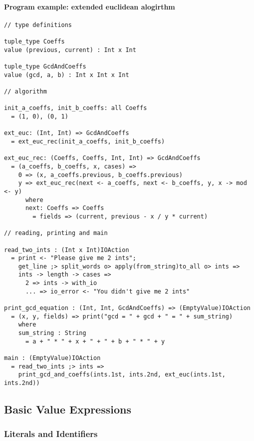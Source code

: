 \documentclass{article}
\begin{document}
\paragraph{Program example: extended euclidean alogirthm}
\begin{verbatim}
// type definitions

tuple_type Coeffs
value (previous, current) : Int x Int

tuple_type GcdAndCoeffs
value (gcd, a, b) : Int x Int x Int

// algorithm

init_a_coeffs, init_b_coeffs: all Coeffs
  = (1, 0), (0, 1)

ext_euc: (Int, Int) => GcdAndCoeffs
  = ext_euc_rec(init_a_coeffs, init_b_coeffs)

ext_euc_rec: (Coeffs, Coeffs, Int, Int) => GcdAndCoeffs
  = (a_coeffs, b_coeffs, x, cases) =>
    0 => (x, a_coeffs.previous, b_coeffs.previous)
    y => ext_euc_rec(next <- a_coeffs, next <- b_coeffs, y, x -> mod <- y)
      where
      next: Coeffs => Coeffs
        = fields => (current, previous - x / y * current)

// reading, printing and main

read_two_ints : (Int x Int)IOAction
  = print <- "Please give me 2 ints";
    get_line ;> split_words o> apply(from_string)to_all o> ints =>
    ints -> length -> cases =>
      2 => ints -> with_io
      ... => io_error <- "You didn't give me 2 ints"
 
print_gcd_equation : (Int, Int, GcdAndCoeffs) => (EmptyValue)IOAction
  = (x, y, fields) => print("gcd = " + gcd + " = " + sum_string)
    where
    sum_string : String
      = a + " * " + x + " + " + b + " * " + y

main : (EmptyValue)IOAction
  = read_two_ints ;> ints =>
    print_gcd_and_coeffs(ints.1st, ints.2nd, ext_euc(ints.1st, ints.2nd))
\end{verbatim}

\subsection{Basic Value Expressions}

\subsubsection{Literals and Identifiers}
\end{document}
